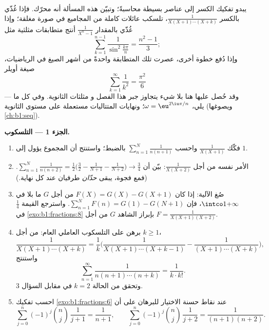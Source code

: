 \begin{problem}\label{pb:b1:fractions:1}
يبدو تفكيك الكسر إلى عناصر بسيطة محاسبةً؛ وتبيّن هذه المسألة
أنه محرّك. فإذا غُذّي بالكسر
$\frac1{X(X+1)\cdots(X+k)}$، تلسكب عائلات كاملة من المجاميع
في صورة مغلقة؛ وإذا غُذّي بالمقدار $\frac1{X^n - 1}$ أنتج
متطابقات مثلثية مثل
\[
\sum_{k=1}^{n-1}\frac{1}{\sin^2\frac{k\pi}{n}} = \frac{n^2-1}{3} ;
\]
وإذا دُفع خطوة أخرى، عصرت تلك المتطابقة واحدةً من
أشهر الصيغ في الرياضيات، صيغة أويلر
\[
\sum_{k=1}^{\infty}\frac1{k^2} = \frac{\pi^2}{6}
\]
--- وقد حُصل عليها هنا بلا شيء يتجاوز جبر هذا الفصل و
مثلثات الثانوية.
وفي كل ما يلي، $\omega = \eu^{2\iu\pi/n}$؛ ونهايات المتتاليات
مستعملة على مستوى الثانوية (ويصوغها \cref{ch:b1:seq}).

\medskip
\noindent\textbf{الجزء 1 --- التلسكوب.}
\begin{enumerate}
  \item فكّك $\frac1{X(X+1)}$ واحسب $\sum_{n=1}^{N}
        \frac1{n(n+1)}$ بالضبط؛ واستنتج أن المجموع يؤول إلى
        $1$.
  \item الأمر نفسه من أجل $\frac1{X(X+2)}$: بيّن أن $\sum_{n=1}^{N}
        \frac1{n(n+2)} = \frac12\bigl(\frac32 - \frac1{N+1} -
        \frac1{N+2}\bigr) \to \frac34$. (فمع فجوة، يبقى \emph{حدّان}
        طرفيان عند كل نهاية.)
  \item صُغ الآلية: إذا كان $F(X) = G(X) - G(X+1)$ من أجل
         $G$ ما بلا  في $\intco1{+\infty}$،
        فإن $\sum_{n=1}^N F(n) = G(1) - G(N+1)$. واسترجع
        القيمة $\frac14$ في \cref{exo:b1:fractions:8} بإبراز
        الشاهد $G$ من أجل $F = \frac1{X(X+1)(X+2)}$.
  \item برهن على التلسكوب العاملي العام: من أجل $k \geq 1$،
        \[
        \frac{1}{X(X+1)\cdots(X+k)}
        = \frac1k\biggl(\frac{1}{X(X+1)\cdots(X+k-1)}
        - \frac{1}{(X+1)\cdots(X+k)}\biggr),
        \]
        واستنتج
        \[
        \sum_{n=1}^{\infty}\frac{1}{n(n+1)\cdots(n+k)}
        = \frac{1}{k \cdot k!} .
        \]
        وتحقق من الحالة $k = 2$ في مقابل السؤال 3.
  \item احسب تفكيك \cref{exo:b1:fractions:6}
        عند نقاط حسنة الاختيار للبرهان على أن
        \[
        \sum_{j=0}^{n}(-1)^j\binom nj\,\frac1{j+1}
        = \frac1{n+1},
        \qquad
        \sum_{j=0}^{n}(-1)^j\binom nj\,\frac1{j+2}
        = \frac1{(n+1)(n+2)} .
        \]
\end{enumerate}


\end{problem}
